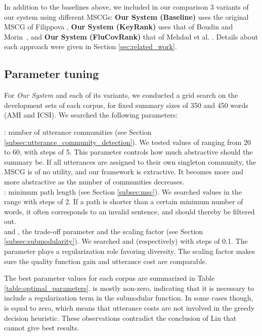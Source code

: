 \documentclass[11pt,a4paper]{article}
\begin{document}
In addition to the baselines above, we included in our comparison 3 variants of our system using different MSCGs: \textbf{Our System (Baseline)} uses the original MSCG of Filippova , \textbf{Our System (KeyRank)} uses that of Boudin and Morin~, and \textbf{Our System (FluCovRank)} that of Mehdad et al. . Details about each approach were given in Section \ref{sec:related_work}.

\subsection{Parameter tuning}
For \textit{Our System} and each of its variants, we conducted a grid search on the development sets of each corpus, for fixed summary sizes of 350 and 450 words (AMI and ICSI). We searched the following parameters:

\noindent  : number of utterance communities (see Section \ref{subsec:utterance_community_detection}). We tested values of  ranging from 20 to 60, with steps of 5. This parameter controls how much abstractive should the summary be. If all utterances are assigned to their own singleton community, the MSCG is of no utility, and our framework is extractive. It becomes more and more abstractive as the number of communities decreases. \\
 : minimum path length (see Section \ref{subsec:msc}). We searched values in the range  with steps of 2. If a path is shorter than a certain minimum number of words, it often corresponds to an invalid sentence, and should thereby be filtered out. \\
  and , the trade-off parameter and the scaling factor (see Section \ref{subsec:submodularity}). We searched  and  (respectively) with steps of 0.1. The parameter  plays a regularization role favoring diversity. The scaling factor makes sure the quality function gain and utterance cost are comparable.

The best parameter values for each corpus are summarized in Table \ref{table:optimal_parameters}.  is mostly non-zero, indicating  that it is necessary to include a regularization term in the submodular function. In some cases though,  is equal to zero, which means that utterance costs are not involved in the greedy decision heuristic. These observations contradict the conclusion of Lin  that  cannot give best results.
\end{document}
